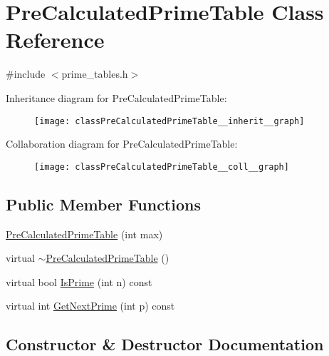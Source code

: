 \hypertarget{classPreCalculatedPrimeTable}{}\section{Pre\+Calculated\+Prime\+Table Class Reference}
\label{classPreCalculatedPrimeTable}


{\ttfamily \#include $<$prime\+\_\+tables.\+h$>$}



Inheritance diagram for Pre\+Calculated\+Prime\+Table\+:\nopagebreak
\begin{figure}[H]
\begin{center}
\leavevmode
\texttt{[image: classPreCalculatedPrimeTable\_\_inherit\_\_graph]}
\end{center}
\end{figure}


Collaboration diagram for Pre\+Calculated\+Prime\+Table\+:\nopagebreak
\begin{figure}[H]
\begin{center}
\leavevmode
\texttt{[image: classPreCalculatedPrimeTable\_\_coll\_\_graph]}
\end{center}
\end{figure}
\subsection*{Public Member Functions}
\begin{DoxyCompactItemize}
\item 
\hyperlink{classPreCalculatedPrimeTable_a6bb947504421e31da70d2c71576be350}{Pre\+Calculated\+Prime\+Table} (int max)
\item 
virtual \hyperlink{classPreCalculatedPrimeTable_a6ceab295f80dbe2766b8d4f54138bbc4}{$\sim$\+Pre\+Calculated\+Prime\+Table} ()
\item 
virtual bool \hyperlink{classPreCalculatedPrimeTable_ae3d0da99f18f4b57d8d63ecebfd65106}{Is\+Prime} (int n) const 
\item 
virtual int \hyperlink{classPreCalculatedPrimeTable_a405c77ebe22cd11d7782ea264502ed39}{Get\+Next\+Prime} (int p) const 
\end{DoxyCompactItemize}


\subsection{Constructor \& Destructor Documentation}
